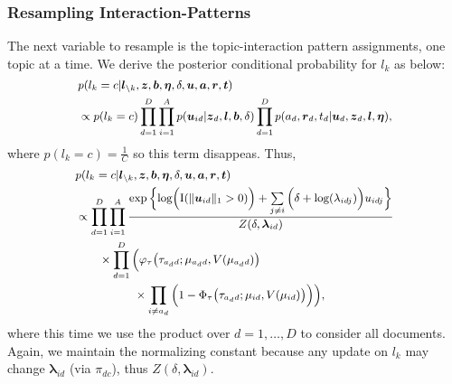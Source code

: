 \documentclass[twoside]{article}
\begin{document}
  	    \subsubsection{Resampling Interaction-Patterns}  \label{subsubsec: Resampling C}
  	   The next variable to resample is the topic-interaction pattern assignments, one topic at a time. We derive the posterior conditional probability for $l_k$ as below:
  	     \begin{equation*}
  	       	 \footnotesize
  	     \begin{aligned} & 
  	     p(l_k=c|\boldsymbol{l}_{\backslash k}, \boldsymbol{z}, \boldsymbol{b},\boldsymbol{\eta}, \delta, \boldsymbol{u}, \boldsymbol{a}, \boldsymbol{r}, \boldsymbol{t})\\
  	     &\propto p(l_k=c)\prod_{d=1}^D\prod_{i=1}^A p(\boldsymbol{u}_{id}| \boldsymbol{z}_d,  \boldsymbol{l}, \boldsymbol{b}, \delta) \prod_{d=1}^Dp({a}_d, \boldsymbol{r}_d, {t}_d|\boldsymbol{u}_d, \boldsymbol{z}_d,  \boldsymbol{l}, \boldsymbol{\eta}),
  	     \end{aligned}
  	     \end{equation*}
  	     where $p(l_k=c) = \frac{1}{C}$ so this term disappeas. Thus, 
  	        \begin{equation*}
  	          	   \footnotesize
  	        \begin{aligned} & 
  	        p(l_k=c|\boldsymbol{l}_{\backslash k}, \boldsymbol{z}, \boldsymbol{b},\boldsymbol{\eta}, \delta, \boldsymbol{u}, \boldsymbol{a}, \boldsymbol{r}, \boldsymbol{t})\\
  	        &  \propto\prod_{d=1}^D
  	     \prod_{i=1}^A \frac{\exp\Big\{\mbox{log}\Big(\text{I}( \lVert \boldsymbol{u}_{id}\rVert_1 > 0 )\Big) + \sum\limits_{j \neq i} \Big(\delta+\mbox{log}(\lambda_{idj})\Big)u_{idj}\Big\}}{Z(\delta,\boldsymbol{\lambda}_{id})}
  	        \\& \quad\quad\times\prod_{d=1}^D\Big(\varphi_{\tau}\big(\tau_{a_d d}; \mu_{a_d d}, V(\mu_{a_d d})\big) \\&\quad\quad\quad\quad\quad\times \prod_{i\neq a_d}\Big(1-\Phi_{\tau} \big(\tau_{a_d d}; \mu_{i d}, V(\mu_{i d})\big) \Big)\Big),
  	        \end{aligned}
  	        \end{equation*}
  	        where this time we use the product over $d=1,\ldots, D$ to consider all documents. Again, we maintain the normalizing constant because any update on $l_k$ may change $\boldsymbol{\lambda}_{id}$ (via $\pi_{dc}$), thus $Z(\delta,\boldsymbol{\lambda}_{id})$.
  	        
\end{document}
